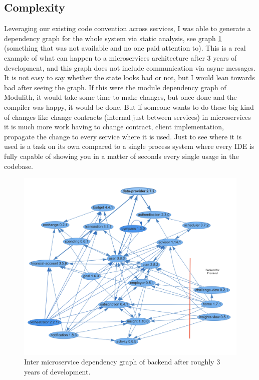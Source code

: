 \subsection{Complexity}
Leveraging our existing code convention across services, I was able to generate a dependency graph for the whole system via static analysis, see graph \ref{img:microservices-current-commented} (something that was not available and no one paid attention to). This is a real example of what can happen to a microservices architecture after 3 years of development, and this graph does not include communication via async messages. It is not easy to say whether the state looks bad or not, but I would lean towards bad after seeing the graph. If this were the module dependency graph of Modulith, it would take some time to make changes, but once done and the compiler was happy, it would be done. But if someone wants to do these big kind of changes like change contracts (internal just between services) in microservices it is much more work having to change contract, client implementation, propagate the change to every service where it is used. Just to see where it is used is a task on its own compared to a single process system where every IDE is fully capable of showing you in a matter of seconds every single usage in the codebase.


\begin{figure}
    \centering
    \includegraphics[width=\textwidth]{images/microservices-current-commented.png}
    \caption{Inter microservice dependency graph of backend after roughly 3 years of development. \label{img:microservices-current-commented}}
\end{figure}

